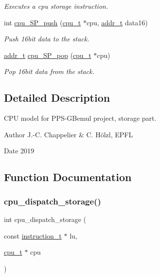 \begin{DoxyCompactItemize}
\begin{DoxyCompactList}\small\item\em Executes a cpu storage instruction. \end{DoxyCompactList}\item 
int \hyperlink{cpu-storage_8h_aba3b649b19e786e16958bb4d8b478ab3}{cpu\+\_\+\+S\+P\+\_\+push} (\hyperlink{structcpu__t}{cpu\+\_\+t} $\ast$cpu, \hyperlink{memory_8h_a8a6444037e4d5cc2bf8ba22a9d9e33ca}{addr\+\_\+t} data16)
\begin{DoxyCompactList}\small\item\em Push 16bit data to the stack. \end{DoxyCompactList}\item 
\hyperlink{memory_8h_a8a6444037e4d5cc2bf8ba22a9d9e33ca}{addr\+\_\+t} \hyperlink{cpu-storage_8h_a809e7f4261a0d5f17708404017d50eb4}{cpu\+\_\+\+S\+P\+\_\+pop} (\hyperlink{structcpu__t}{cpu\+\_\+t} $\ast$cpu)
\begin{DoxyCompactList}\small\item\em Pop 16bit data from the stack. \end{DoxyCompactList}\end{DoxyCompactItemize}


\subsection{Detailed Description}
C\+PU model for P\+P\+S-\/\+G\+Bemul project, storage part. 

\begin{DoxyAuthor}{Author}
J.-\/C. Chappelier \& C. Hölzl, E\+P\+FL 
\end{DoxyAuthor}
\begin{DoxyDate}{Date}
2019 
\end{DoxyDate}


\subsection{Function Documentation}
\mbox{\label{cpu-storage_8h_a59cdfbe22b2caa6792b7bbb53656e3ef}} 
\subsubsection{\texorpdfstring{cpu\+\_\+dispatch\+\_\+storage()}{cpu\_dispatch\_storage()}}
{\footnotesize\ttfamily int cpu\+\_\+dispatch\+\_\+storage (\begin{DoxyParamCaption}\item[{const \hyperlink{structinstruction__t}{instruction\+\_\+t} $\ast$}]{lu,  }\item[{\hyperlink{structcpu__t}{cpu\+\_\+t} $\ast$}]{cpu }\end{DoxyParamCaption})}



